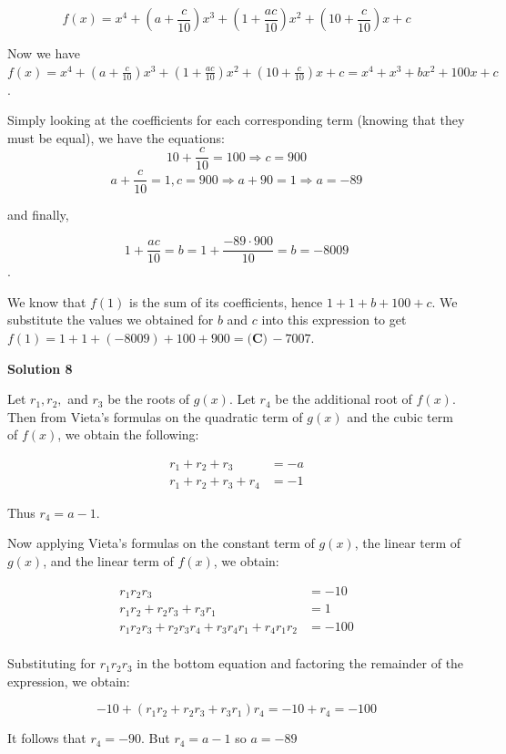 \begin{enumerate}
 
 \[f(x) = x^4+\left(a+\frac{c}{10}\right)x^3+\left(1+\frac{ac}{10}\right)x^2+\left(10+\frac{c}{10}\right)x+c\]

 Now we have $f(x) = x^4+\left(a+\frac{c}{10}\right)x^3+\left(1+\frac{ac}{10}\right)x^2+\left(10+\frac{c}{10} \right)x+c=x^4+x^3+bx^2+100x+c$.

 Simply looking at the coefficients for each corresponding term (knowing that they must be equal), we have the equations:
 \[10+\frac{c}{10}=100 \Rightarrow c=900\]
 \[a+\frac{c}{10} = 1, c=900 \Rightarrow a + 90 =1 \Rightarrow a= -89\]

 and finally,

 
 \[1+\frac{ac}{10} = b = 1+\frac{-89 \cdot 900}{10} = b = -8009\].

 We know that $f(1)$ is the sum of its coefficients, hence $1+1+b+100+c$. We substitute the values we obtained for $b$ and $c$ into this expression to get $f(1) = 1 + 1 + (-8009) + 100 + 900 = \boxed{\textbf{(C)}\,-7007}$.

 



\textbf{Solution 8}

Let $r_1,r_2,$ and $r_3$ be the roots of $g(x)$. Let $r_4$ be the additional root of $f(x)$. Then from Vieta's formulas on the quadratic term of $g(x)$ and the cubic term of $f(x)$, we obtain the following:

 
 \begin{align*} r_1+r_2+r_3&=-a \\  r_1+r_2+r_3+r_4&=-1 \end{align*}


 Thus $r_4=a-1$.

 Now applying Vieta's formulas on the constant term of $g(x)$, the linear term of $g(x)$, and the linear term of $f(x)$, we obtain:

 
 \begin{align*} r_1r_2r_3  & = -10\\ r_1r_2+r_2r_3+r_3r_1 &= 1\\  r_1r_2r_3+r_2r_3r_4+r_3r_4r_1+r_4r_1r_2  & = -100\\ \end{align*}


 Substituting for $r_1r_2r_3$ in the bottom equation and factoring the remainder of the expression, we obtain:

 
 \[-10+(r_1r_2+r_2r_3+r_3r_1)r_4=-10+r_4=-100\]

 It follows that $r_4=-90$. But $r_4=a-1$ so $a=-89$


\end{enumerate}
